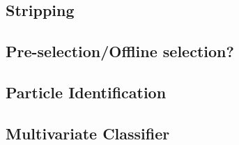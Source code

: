 \subsection{Stripping}
\label{sec:stripping}


\subsection{Pre-selection/Offline selection?}
\label{sec:offline_sel}

\subsection{Particle Identification}
\label{sec:PID}

\subsection{Multivariate Classifier}
\label{sec:BDT}
